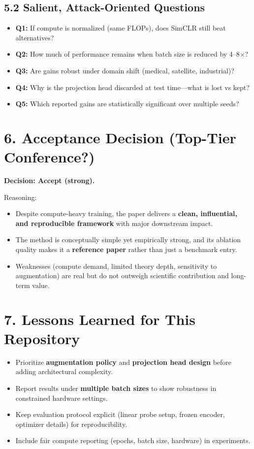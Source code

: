\documentclass[11pt,a4paper]{article}
\begin{document}
\subsection*{5.2 Salient, Attack-Oriented Questions}
\begin{itemize}[leftmargin=1.5em]
    \item \textbf{Q1:} If compute is normalized (same FLOPs), does SimCLR still beat alternatives?
    \item \textbf{Q2:} How much of performance remains when batch size is reduced by 4--8$\times$?
    \item \textbf{Q3:} Are gains robust under domain shift (medical, satellite, industrial)?
    \item \textbf{Q4:} Why is the projection head discarded at test time---what is lost vs kept?
    \item \textbf{Q5:} Which reported gains are statistically significant over multiple seeds?
\end{itemize}

\section*{6. Acceptance Decision (Top-Tier Conference?)}
\textbf{Decision: Accept (strong).}

Reasoning:
\begin{itemize}[leftmargin=1.5em]
    \item Despite compute-heavy training, the paper delivers a \textbf{clean, influential, and reproducible framework} with major downstream impact.
    \item The method is conceptually simple yet empirically strong, and its ablation quality makes it a \textbf{reference paper} rather than just a benchmark entry.
    \item Weaknesses (compute demand, limited theory depth, sensitivity to augmentation) are real but do not outweigh scientific contribution and long-term value.
\end{itemize}

\section*{7. Lessons Learned for This Repository}
\begin{itemize}[leftmargin=1.5em]
    \item Prioritize \textbf{augmentation policy} and \textbf{projection head design} before adding architectural complexity.
    \item Report results under \textbf{multiple batch sizes} to show robustness in constrained hardware settings.
    \item Keep evaluation protocol explicit (linear probe setup, frozen encoder, optimizer details) for reproducibility.
    \item Include fair compute reporting (epochs, batch size, hardware) in experiments.
\end{itemize}
\end{document}
